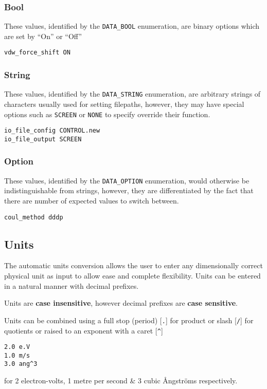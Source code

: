 \subsubsection{Bool}
These values, identified by the \verb#DATA_BOOL# enumeration, are binary options which are set by ``On'' or ``Off''

\begin{verbatim}
vdw_force_shift ON
\end{verbatim}

\subsubsection{String}
These values, identified by the \verb#DATA_STRING# enumeration, are arbitrary strings of characters usually used for setting filepaths, however, they may have special options such as \verb#SCREEN# or \verb#NONE# to specify override their function.

\begin{verbatim}
io_file_config CONTROL.new
io_file_output SCREEN
\end{verbatim}

\subsubsection{Option}
These values, identified by the \verb#DATA_OPTION# enumeration, would otherwise be indistinguishable from strings, however, they are differentiated by the fact that there are number of expected values to switch between.

\begin{verbatim}
coul_method dddp
\end{verbatim}

\subsection{Units}\label{new_control:units}
The automatic units conversion allows the user to enter any dimensionally correct physical unit as input to allow ease and complete flexibility. Units can be entered in a natural manner with decimal prefixes.

Units are \textbf{case insensitive}, however decimal prefixes are \textbf{case sensitive}.

Units can be combined using a full stop (period) [\verb#.#] for product or slash [\verb#/#] for quotients or raised to an exponent with a caret [\verb#^#]
\begin{verbatim}
2.0 e.V
1.0 m/s
3.0 ang^3
\end{verbatim}
for 2 electron-volts, 1 metre per second \& 3 cubic \AA{}ngstr\"oms respectively.

